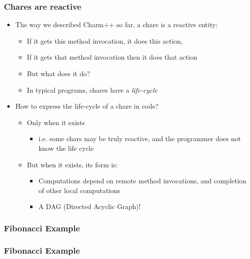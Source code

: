 
\begin{frame}[fragile]
  \frametitle{Chares are reactive}
  \begin{itemize}
    \item The way we described Charm++ so far, a chare is a reactive entity:
      \begin{itemize}
      \item If it gets this method invocation, it does this action,
      \item If it gets that method invocation then it does that action
      \item But what does it do?
      \item In typical programs, chares have a \emph{life-cycle}
      \end{itemize}
    \item How to express the life-cycle of a chare in code?
      \begin{itemize}
      \item Only when it exists
        \begin{itemize}
        \item i.e. some chars may be truly reactive, and the programmer does
          not know the life cycle
        \end{itemize}
      \item But when it exists, its form is:
        \begin{itemize}
        \item Computations depend on remote method invocations, and completion
          of other local computations
        \item A DAG (Directed Acyclic Graph)!
        \end{itemize}
      \end{itemize}
  \end{itemize}
\end{frame}

\begin{frame}[fragile]
  \frametitle{Fibonacci Example}
  
\end{frame}

\begin{frame}[fragile]
  \frametitle{Fibonacci Example}
  
\end{frame}


